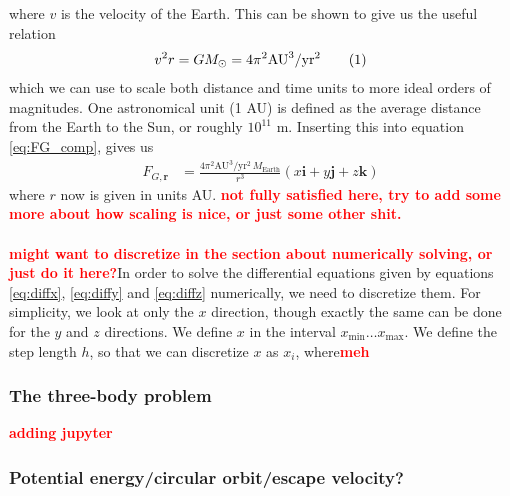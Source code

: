 \documentclass{article}
\newcommand\red[1]{\textcolor{red}{\textbf{#1}}}
\newcommand\numberthis{\addtocounter{equation}{1}\tag{\theequation}}
\begin{document}
where $v$ is the velocity of the Earth. This can be shown to give us the useful relation
\begin{align*}
  v^2r = GM_{\odot} = 4\pi^2\text{AU}^3/\text{yr}^2\numberthis\label{eq:mass_units}
\end{align*}
which we can use to scale both distance and time units to more ideal orders of magnitudes. One astronomical unit (1 AU) is defined as the average distance from the Earth to the Sun, or roughly $10^{11}$ m. Inserting this into equation \eqref{eq:FG_comp}, gives us
\begin{align*}
  F_{G,\mathbf{r}} &= \frac{4\pi^2\text{AU}^3/\text{yr}^2\,M_{\text{Earth}}}{r^3}(x\mathbf{i}+y\mathbf{j}+z\mathbf{k})
\end{align*} 
where $r$ now is given in units AU. \red{not fully satisfied here, try to add some more about how scaling is nice, or just some other shit.}
\\\\
\red{might want to discretize in the section about numerically solving, or just do it here?}In order to solve the differential equations given by equations \eqref{eq:diffx}, \eqref{eq:diffy} and \eqref{eq:diffz} numerically, we need to discretize them. For simplicity, we look at only the $x$ direction, though exactly the same can be done for the $y$ and $z$ directions. We define $x$ in the interval $x_{\text{min}} \dots x_{\text{max}}$. We define the step length $h$, so that we can discretize $x$ as $x_i$, where\red{meh}
\subsubsection{The three-body problem}
\red{adding jupyter}
\subsubsection{Potential energy/circular orbit/escape velocity?}
\end{document}
